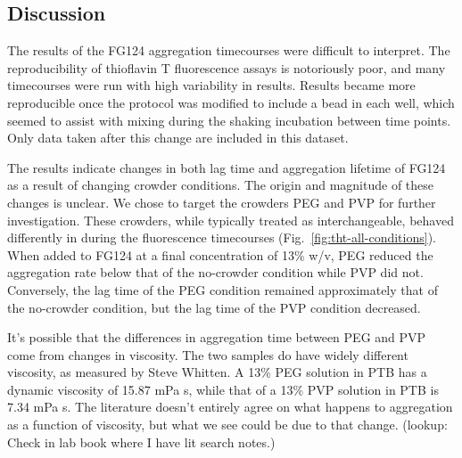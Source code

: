 


\subsection{Discussion}

The results of the FG124 aggregation timecourses were difficult to interpret.  The reproducibility of thioflavin T fluorescence assays is notoriously poor, and many timecourses were run with high variability in results.  Results became more reproducible once the protocol was modified to include a bead in each well, which seemed to assist with mixing during the shaking incubation between time points.  Only data taken after this change are included in this dataset.

The results indicate changes in both lag time and aggregation lifetime of FG124 as a result of changing crowder conditions.  The origin and magnitude of these changes is unclear.  We chose to target the crowders PEG and PVP for further investigation.  These crowders, while typically treated as interchangeable, behaved differently in during the fluorescence timecourses (Fig.~\ref{fig:tht-all-conditions}).  When added to FG124 at a final concentration of 13\% w/v, PEG reduced the aggregation rate below that of the no-crowder condition while PVP did not.  Conversely, the lag time of the PEG condition remained approximately that of the no-crowder condition, but the lag time of the PVP condition decreased.

It's possible that the differences in aggregation time between PEG and PVP come from changes in viscosity.  The two samples do have widely different viscosity, as measured by Steve Whitten.  A 13\% PEG solution in PTB has a dynamic viscosity of 15.87 mPa s, while that of a 13\% PVP solution in PTB is 7.34 mPa s.  The literature doesn't entirely agree on what happens to aggregation as a function of viscosity, but what we see could be due to that change.  (lookup: Check in lab book where I have lit search notes.)

